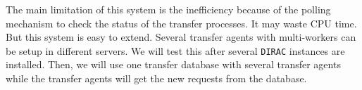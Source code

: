 The main limitation of this system is the inefficiency because of 
the polling mechanism to check the status of the transfer processes.
It may waste CPU time. But this system is easy to extend.
Several transfer agents with multi-workers can be setup in different servers.
We will test this after several {\tt DIRAC} instances are installed.
Then, we will use one transfer database with several transfer agents
while the transfer agents will get the new requests from the database.
